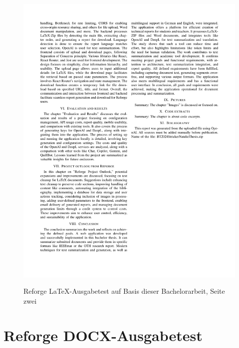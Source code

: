 \begin{figure}[H]
\centering
\includegraphics[width=1\linewidth]{Images/ReforgeTestGen2.pdf}\\
\caption{Reforge LaTeX-Ausgabetest auf Basis dieser Bachelorarbeit, Seite zwei}
\label{fig:Reforge_testgen2}
\end{figure}

\section{Reforge DOCX-Ausgabetest}

